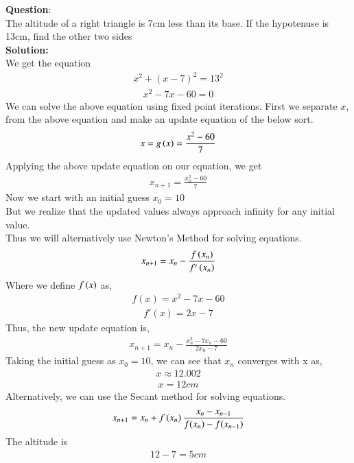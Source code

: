 \documentclass[journal]{IEEEtran}
\begin{document}
	
\textbf{Question}:\\
The altitude of a right triangle is 7cm less than its base. If the hypotenuse is 13cm, find the other two sides 
\\
\textbf{Solution: }\\
We get the equation 
\begin{align}
    x^2 + (x-7)^2 = 13^2 
\end{align}
\begin{align}
     x^2-7x-60 =0
\end{align}
We can solve the above equation using fixed point iterations. First we separate $x$, from the above equation and make an update equation of the below sort.
\begin{align}
	x = g\left(x\right) = \frac{x^2-60}{7}
\end{align}
Applying the above update equation on our equation, we get
\begin{align}
	x_{n+1}=\frac{x_n^2-60}{7}
\end{align}
Now we start with an initial guess $x_0 = 10 $\\
 But we realize that the updated values always approach infinity for any initial value. \\
Thus we will alternatively use Newton's Method for solving equations.
\begin{align}
	x_{n+1} = x_n - \frac{f\left(x_n\right)}{f^{\prime}\left(x_n\right)} 
\end{align}
Where we define $f\left(x\right)$ as, 
\begin{align}
	f(x) = x^2 - 7x - 60 
\end{align}
\begin{align}
    f'(x) = 2x - 7
\end{align}
Thus, the new update equation is, 
\begin{align}
	x_{n+1} = x_n - \frac{x_n^2-7x_n-60}{2x_n-7 } 
\end{align}
Taking the initial guess as $x_0 = 10$, we can see that $x_n$ converges with x as,
\begin{align}
	x \approx 12.002
\end{align}
\begin{align}
    x = 12cm 
\end{align}
Alternatively, we can use the Secant method for solving equations.
\begin{align}
	x_{n+1} = x_n + f\left(x_n\right)\frac{x_{n} -  x_{n-1}}{f(x_{n}) -  f(x_{n-1})}
\end{align}
The altitude is 
\begin{align}
    12 - 7 = 5cm 
\end{align}
\end{document}
